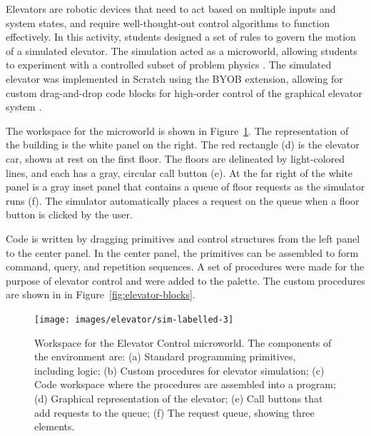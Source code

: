 	Elevators are robotic devices that need to act based on multiple inputs and system states, and require well-thought-out control algorithms to function effectively. In this activity, students designed a set of rules to govern the motion of a simulated elevator. The simulation acted as a microworld, allowing students to experiment with a controlled subset of problem physics \citep{levin87}. The simulated elevator was implemented in Scratch using the BYOB extension, allowing for custom drag-and-drop code blocks for high-order control of the graphical elevator system \citep{scratch, byob}.
	
	The workspace for the microworld is shown in Figure~\ref{fig:elevator-workspace}. The representation of the building is the white panel on the right. The red rectangle (d) is the elevator car, shown at rest on the first floor. The floors are delineated by light-colored lines, and each has a gray, circular call button (e). At the far right of the white panel is a gray inset panel that contains a queue of floor requests as the simulator runs (f). The simulator automatically places a request on the queue when a floor button is clicked by the user. 
	
	Code is written by dragging primitives and control structures from the left panel to the center panel. In the center panel, the primitives can be assembled to form command, query, and repetition sequences. A set of procedures were made for the purpose of elevator control and were added to the palette. The custom procedures are shown in in Figure~\ref{fig:elevator-blocks}.
	
	\begin{figure}
	\begin{centering}
	\texttt{[image: images/elevator/sim-labelled-3]} %
	\par\end{centering}
	\caption[Workspace for the Elevator Control microworld.]{
		Workspace for the Elevator Control microworld. The components of the environment are: (a) Standard programming primitives, including logic; (b) Custom procedures for elevator simulation; (c) Code workspace where the procedures are assembled into a program; (d) Graphical representation of the elevator; (e) Call buttons that add requests to the queue; (f) The request queue, showing three elements.
	}
	\label{fig:elevator-workspace}
	\end{figure}
	


